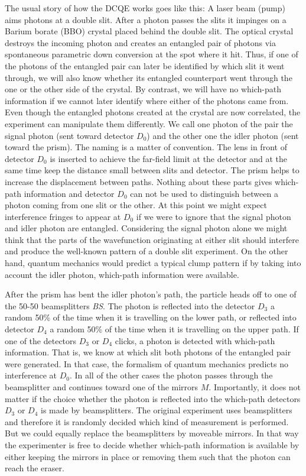 \documentclass[11pt]{article}
\numberwithin{equation}{section}
\begin{document}
The usual story of how the DCQE works goes like this: A laser beam (pump) aims photons at a double slit. After a photon passes the slits it impinges on a Barium borate (BBO) crystal placed behind the double slit. The optical crystal destroys the incoming photon and creates an entangled pair of photons  via spontaneous parametric down conversion at the spot where it hit. Thus, if one of the photons of the entangled pair can later be identified by which slit it went through, we will also know whether its entangled counterpart went through the one or the other side of the crystal.   
By contrast, we will have no which-path information if we cannot later identify where either of the photons came from. Even though the entangled photons created at the crystal are now correlated, the experiment can manipulate them differently. We call one photon of the pair the signal photon (sent toward detector $D_0$) and the other one the idler photon (sent toward the prism). The naming is a matter of convention. The lens in front of detector $D_0$ is inserted to achieve the far-field limit at the detector and at the same time keep the distance small between slits and detector. The prism helps to increase the displacement between paths. Nothing about these parts gives which-path information and detector $D_0$ can not be used to distinguish between a photon coming from one slit or the other. At this point we might expect interference fringes to appear at $D_0$ if we were to ignore that the signal photon and idler photon are entangled. Considering the signal photon alone we might think that the parts of the wavefunction originating at either slit should interfere and produce the well-known pattern of a double slit experiment. On the other hand, quantum mechanics would predict a typical clump pattern if by taking into account the idler photon, which-path information were available.
 
After the prism has bent the idler photon's path, the particle heads off to one of the 50-50 beamsplitters \textit{BS}. The photon is reflected into the detector $D_3$ a random 50\% of the time when it is travelling on the lower path, or reflected into detector $D_4$ a random 50\% of the time when it is travelling on the upper path. If one of the detectors $D_3$ or $D_4$ clicks, a photon is detected with which-path information. That is, we know at which slit both photons of the entangled pair were generated. In that case, the formalism of quantum mechanics predicts no interference at $D_0$. In all of the other cases the photon passes through the beamsplitter and continues toward one of the mirrors $M$. Importantly, it does not matter if the choice whether the photon is reflected into the which-path detectors $D_3$ or $D_4$ is made by beamsplitters. The original experiment uses beamsplitters and therefore it is randomly decided which kind of measurement is performed. But we could equally replace the beamsplitters by moveable mirrors. In that way the experimenter is free to decide whether which-path information is available by either keeping the mirrors in place or removing them such that the photon can reach the eraser. 
\end{document}
